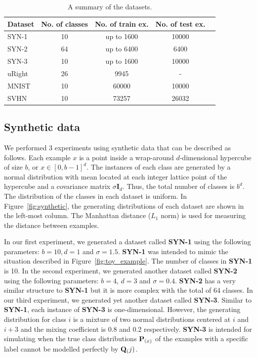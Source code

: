 \documentclass{article}
\begin{document}
\begin{table}[tb]
\caption{A summary of the datasets.}
\label{table:results}
\vskip 0.1in
\begin{center}
\begin{scriptsize}
\begin{sc}
\begin{tabular}{lcccc}
  \hline
  \abovespace\belowspace
  Dataset & No. of classes & No. of train ex. & No. of test ex. \\
  \hline
  \abovespace
  SYN-1 & 10 & up to 1600 & 10000\\
  SYN-2 & 64 & up to 6400 & 6400\\
  \belowspace
  SYN-3 & 10 & up to 1600 & 10000\\
  \hline
  \abovespace
  uRight & 26 & 9945 & -  \\
  MNIST & 10 & 60000 & 10000 \\
  \belowspace
  SVHN & 10 & 73257 & 26032\\
  \hline
\end{tabular}
\end{sc}
\end{scriptsize}
\end{center}
\vskip -0.1in
\end{table}

\subsection{Synthetic data}
We performed 3 experiments using synthetic data that can be described
as follows. Each example $x$ is a point inside a wrap-around
$d$-dimensional hypercube of size $b$, or $x \in [0,b-1]^d$. The
instances of each class are generated by a normal distribution with
mean located at each integer lattice point of the hypercube and a
covariance matrix $\sigma \mathbf{I}_d$. Thus, the total number of
classes is $b^d$. The distribution of the classes in each dataset is
uniform. In Figure~\ref{fig:synthetic}, the generating distributions
of each dataset are shown in the left-most column. The Manhattan
distance ($L_1$ norm) is used for measuring the distance between
examples.

In our first experiment, we generated a dataset called \textbf{SYN-1}
using the following parameters: $b=10, d=1$ and
$\sigma=1.5$. \textbf{SYN-1} was intended to mimic the situation
described in Figure~\ref{fig:toy_example}. The number of classes in
\textbf{SYN-1} is 10. In the second experiment, we generated another
dataset called \textbf{SYN-2} using the following parameters: $b=4$,
$d=3$ and $\sigma=0.4$. \textbf{SYN-2} has a very similar structure to
\textbf{SYN-1} but it is more complex with the total of $64$
classes. In our third experiment, we generated yet another dataset
called \textbf{SYN-3}. Similar to \textbf{SYN-1}, each instance of
\textbf{SYN-3} is one-dimensional. However, the generating
distribution for class $i$ is a mixture of two normal distributions
centered at $i$ and $i+3$ and the mixing coefficient is 0.8 and 0.2
respectively. \textbf{SYN-3} is intended for simulating when the true
class distributions $\mathbf{P}_{(x)}$ of the examples with a specific label
cannot be modelled perfectly by $\mathbf{Q}_(j)$.  
\end{document}

